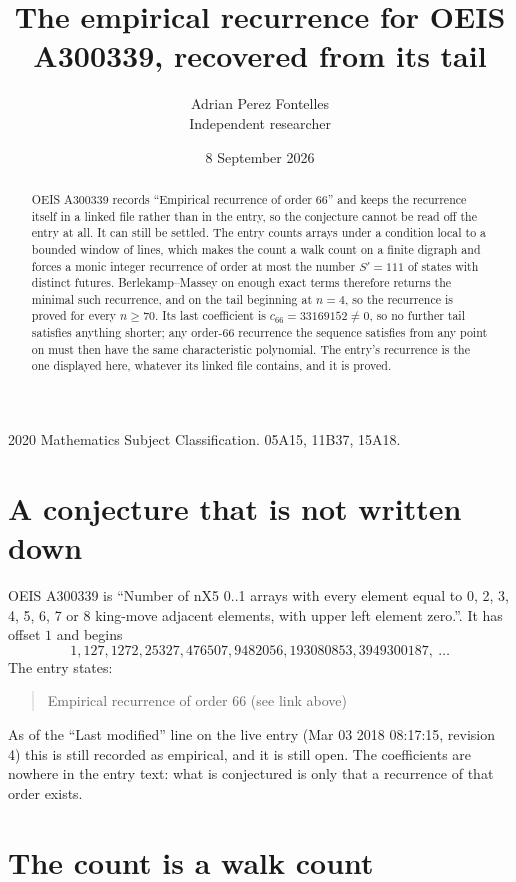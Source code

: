 \documentclass[11pt,a4paper]{article}
\title{The empirical recurrence for OEIS A300339, recovered from its tail}
\author{Adrian Perez Fontelles\\ \small Independent researcher}
\date{8 September 2026}
\theoremstyle{plain}
\theoremstyle{definition}
\begin{document}
\maketitle

\begin{abstract}
OEIS A300339 records ``Empirical recurrence of order $66$'' and keeps the recurrence itself in
a linked file rather than in the entry, so the conjecture cannot be read off the entry at all.
It can still be settled. The entry counts arrays under a condition local to a bounded window of
lines, which makes the count a walk count on a finite digraph and forces a monic integer
recurrence of order at most the number $S'=111$ of states with distinct futures. Berlekamp--Massey on
enough exact terms therefore returns the minimal such recurrence, and on the tail beginning at $n=4$, so the recurrence is proved for every $n\ge70$.
Its last coefficient is $c_{66}=33169152\neq0$, so no further tail satisfies anything
shorter; any order-$66$ recurrence the sequence satisfies from any point on must then have
the same characteristic polynomial. The entry's recurrence is the one displayed here, whatever
its linked file contains, and it is proved.
\end{abstract}

\noindent\small 2020 Mathematics Subject Classification. 05A15, 11B37, 15A18.\normalsize

\section{A conjecture that is not written down}

OEIS A300339 is ``Number of nX5 0..1 arrays with every element equal to 0, 2, 3, 4, 5, 6, 7 or 8 king-move adjacent elements, with upper left element zero.''. It has offset $1$ and begins
\[
1, 127, 1272, 25327, 476507, 9482056, 193080853, 3949300187,\ \dots
\]
The entry states:
\begin{quote}
Empirical recurrence of order 66 (see link above)
\end{quote}
As of the ``Last modified'' line on the live entry (Mar 03 2018 08:17:15, revision 4)
this is still recorded as empirical, and it is still open. The coefficients are nowhere in the
entry text: what is conjectured is only that a recurrence of that order exists.

\section{The count is a walk count}
\end{document}

